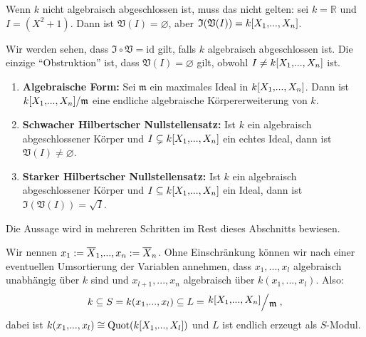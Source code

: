 \documentclass[a4paper,12pt,index=toc]{scrbook}
\theoremstyle{keinenummern} %
\def\V{\mathfrak{V}}
\def\I{\mathfrak{I}}
\def\m{\mathfrak{m}}
\newcommand{\id}{\mathrm{id}}
\newcommand{\leer}{\ensuremath{\varnothing}}
\newcommand{\Quot}{\operatorname{Quot}}
\renewcommand{\dotsc}{\ensuremath{\!...}}
\newcommand{\set}[1]{\ensuremath{\mathbb{#1}}}
\newcommand{\R}{\set{R}}
\def\Bar#1{\ensuremath\overline{#1}}
\newcommand{\polyx}[1][n]{\ensuremath%
  [X_{1},\dotsc,X_{#1}]}
\begin{document}
\begin{nbsp}
  Wenn $k$ nicht algebraisch abgeschlossen ist, muss das nicht gelten: sei $k=\R$ und $I=(X^2+1)$. Dann ist $\V(I)=\leer$, aber
  $\I(\V(I)) = k\polyx$.
\end{nbsp}

Wir werden sehen, dass $\I\circ\V=\id$ gilt, falls $k$ algebraisch abgeschlossen ist. Die einzige \enquote{Obstruktion} ist,
dass $\V(I)=\leer$ gilt, obwohl $I\neq k\polyx$ ist.

\begin{satz}\label{satz2}\label{HNS}
  \begin{enumerate}
  \item{} {\bf Algebraische Form:} Sei $\m$ ein maximales Ideal in \relax $k\polyx$. Dann ist
    $\Quotient{k\polyx}{\m}$ eine endliche algebraische Körpererweiterung von $k$.
  \item {\bf Schwacher Hilbertscher Nullstellensatz:} Ist $k$ ein algebraisch abgeschlossener Körper und
    $I\subsetneq k\polyx$ ein echtes Ideal, dann ist $\V(I)\neq\leer$.
  \item {\bf Starker Hilbertscher Nullstellensatz:} Ist $k$ ein algebraisch abgeschlossener Körper und $I\subseteq
    k\polyx$ ein Ideal, dann ist $\I(\V(I))=\sqrt{I}$.
  \end{enumerate}
\end{satz}

Die Aussage wird in mehreren Schritten im Rest dieses Abschnitts bewiesen.

Wir nennen $x_1:=\Bar{X}_1,\dotsc,x_n:=\Bar{X}_n$. Ohne Einschränkung können wir nach einer eventuellen Umsortierung
der Variablen annehmen, dass $x_1,\dotsc,x_l$ algebraisch unabhängig über $k$ sind und $x_{l+1},\dotsc,x_n$ algebraisch über
$k(x_1,\dotsc,x_l)$. Also:
\[ k \subseteq S = k(x_1,\dotsc,x_l) \subseteq L=\Quotient{k\polyx}{\m}, \]
dabei ist $k(x_1,\dotsc,x_l)\cong\Quot(k\polyx[l])$ und $L$ ist endlich erzeugt als $S$-Modul.
\end{document}
